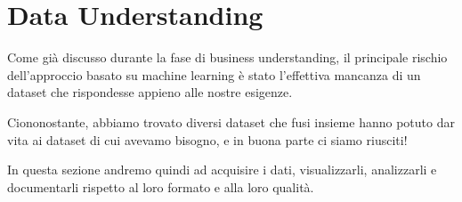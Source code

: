 \documentclass[a4paper, 11pt, oneside]{report}
\begin{document}
            \newpage
            \section{Data Understanding}
            Come già discusso durante la fase di business understanding, il principale rischio dell'approccio basato su machine
            learning è stato l'effettiva mancanza di un dataset che rispondesse appieno alle nostre esigenze.
            \par \noindent Ciononostante, abbiamo trovato diversi dataset che fusi insieme hanno potuto
            dar vita ai dataset di cui avevamo bisogno, e in buona parte ci siamo riusciti!
            \par \noindent In questa sezione andremo quindi ad acquisire i dati, visualizzarli, analizzarli e documentarli rispetto al loro
            formato e alla loro qualità.
\end{document}
